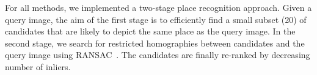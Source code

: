       For all methods, we implemented a two-stage place recognition approach. Given a query image, the aim of the first stage is to efficiently find a small subset (20) of candidates that are likely to depict the same place as the query image. In the second stage, we search for restricted homographies between candidates and the query image using RANSAC~\cite{Philbin07}. The candidates are finally re-ranked by decreasing number of inliers.


